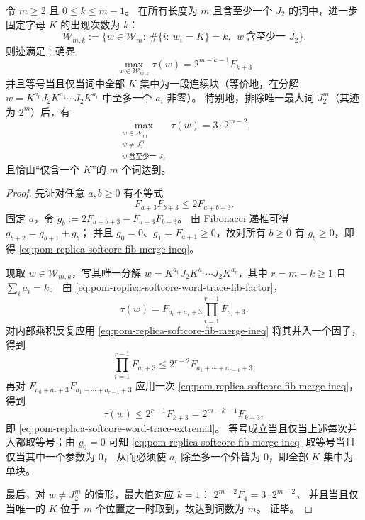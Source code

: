 \begin{proposition}[固定 \(K\) 计数下的词迹极值]\label{prop:pom-replica-softcore-word-trace-extremal}
令 \(m\ge 2\) 且 \(0\le k\le m-1\)。
在所有长度为 \(m\) 且含至少一个 \(J_2\) 的词中，进一步固定字母 \(K\) 的出现次数为 \(k\)：
\[
\mathcal{W}_{m,k}:=\bigl\{w\in\mathcal{W}_m:\ \#\{i:\ w_i=K\}=k,\ \ w\ \text{含至少一 }J_2\bigr\}.
\]
则迹满足上确界
\begin{equation}\label{eq:pom-replica-softcore-word-trace-extremal}
\boxed{\;
\max_{w\in\mathcal{W}_{m,k}}\tau(w)=2^{m-k-1}F_{k+3}\;}
\end{equation}
并且等号当且仅当词中全部 \(K\) 集中为一段连续块（等价地，在分解 \(w=K^{a_0}J_2K^{a_1}\cdots J_2K^{a_r}\) 中至多一个 \(a_i\) 非零）。
特别地，排除唯一最大词 \(J_2^m\)（其迹为 \(2^m\)）后，有
\[
\max_{\substack{w\in\mathcal{W}_m\\ w\neq J_2^m\\ w\ \text{含至少一 }J_2}}\tau(w)=3\cdot 2^{m-2},
\]
且恰由“仅含一个 \(K\)”的 \(m\) 个词达到。
\end{proposition}
\begin{proof}
先证对任意 \(a,b\ge 0\) 有不等式
\begin{equation}\label{eq:pom-replica-softcore-fib-merge-ineq}
F_{a+3}F_{b+3}\le 2F_{a+b+3}.
\end{equation}
固定 \(a\)，令 \(g_b:=2F_{a+b+3}-F_{a+3}F_{b+3}\)。
由 Fibonacci 递推可得 \(g_{b+2}=g_{b+1}+g_b\)；
并且 \(g_0=0\)、\(g_1=F_{a+1}\ge 0\)，故对所有 \(b\ge 0\) 有 \(g_b\ge 0\)，即得 \eqref{eq:pom-replica-softcore-fib-merge-ineq}。
\par
现取 \(w\in\mathcal{W}_{m,k}\)，写其唯一分解 \(w=K^{a_0}J_2K^{a_1}\cdots J_2K^{a_r}\)，其中 \(r=m-k\ge 1\) 且 \(\sum_i a_i=k\)。
由 \eqref{eq:pom-replica-softcore-word-trace-fib-factor}，
\[
\tau(w)=F_{a_0+a_r+3}\prod_{i=1}^{r-1}F_{a_i+3}.
\]
对内部乘积反复应用 \eqref{eq:pom-replica-softcore-fib-merge-ineq} 将其并入一个因子，得到
\[
\prod_{i=1}^{r-1}F_{a_i+3}\le 2^{r-2}F_{a_1+\cdots+a_{r-1}+3}.
\]
再对 \(F_{a_0+a_r+3}F_{a_1+\cdots+a_{r-1}+3}\) 应用一次 \eqref{eq:pom-replica-softcore-fib-merge-ineq}，得到
\[
\tau(w)\le 2^{r-1}F_{k+3}=2^{m-k-1}F_{k+3},
\]
即 \eqref{eq:pom-replica-softcore-word-trace-extremal}。
等号成立当且仅当上述每次并入都取等号；由 \(g_0=0\) 可知 \eqref{eq:pom-replica-softcore-fib-merge-ineq} 取等号当且仅当其中一个参数为 \(0\)，
从而必须使 \(a_i\) 除至多一个外皆为 \(0\)，即全部 \(K\) 集中为单块。
\par
最后，对 \(w\neq J_2^m\) 的情形，最大值对应 \(k=1\)：
\(
2^{m-2}F_4=3\cdot 2^{m-2}
\)，
并且当且仅当唯一的 \(K\) 位于 \(m\) 个位置之一时取到，故达到词数为 \(m\)。
证毕。
\end{proof}

\endinput

